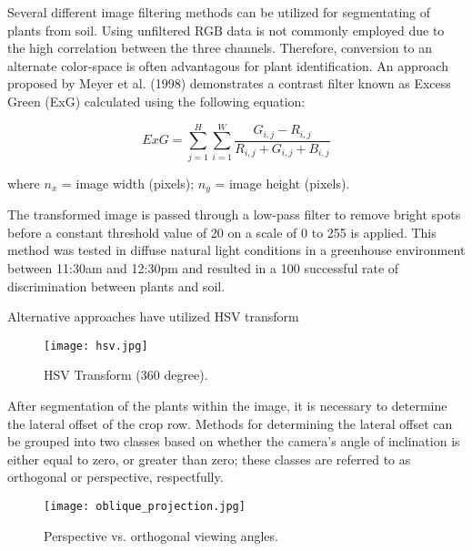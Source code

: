 Several different image filtering methods can be utilized for
segmentating of plants from soil. Using unfiltered RGB data is not
commonly employed due to the high correlation between the three
channels. Therefore, conversion to an alternate color-space is often
advantagous for plant identification. An approach proposed by Meyer et
al. (1998) demonstrates a contrast filter known as Excess Green (ExG)
calculated using the following equation:

\begin{equation}
    ExG = \displaystyle\sum_{j=1}^{H} \displaystyle\sum_{i=1}^{W} \frac{G_{i,j}-R_{i,j}}{R_{i,j} + G_{i,j} + B_{i,j}}
\end{equation}
\begin{flushleft}
where $n_{x}$ = image width (pixels); $n_{y}$ = image height (pixels).
\end{flushleft}

The transformed image is passed through a low-pass filter to remove
bright spots before a constant threshold value of 20 on a scale of 0
to 255 is applied. This method was tested in diffuse natural light
conditions in a greenhouse environment between 11:30am and 12:30pm and
resulted in a 100 successful rate of discrimination between plants and
soil.

Alternative approaches have utilized HSV transform

\begin{figure}
  \centering
  \texttt{[image: hsv.jpg]}
  \caption{HSV Transform (360 degree).}
  \label{fig:hsv}
\end{figure}

After segmentation of the plants within the image, it is necessary to
determine the lateral offset of the crop row. Methods for determining
the lateral offset can be grouped into two classes based on whether
the camera’s angle of inclination is either equal to zero, or greater
than zero; these classes are referred to as orthogonal or perspective,
respectfully. 

\begin{figure}
  \centering
  \texttt{[image: oblique\_projection.jpg]}
  \caption{Perspective vs. orthogonal viewing angles.}
  \label{fig:projection}
\end{figure}


